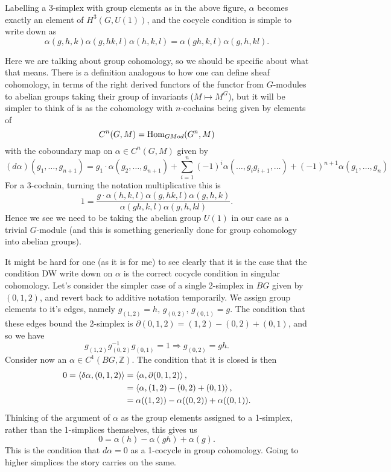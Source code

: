 \documentclass{article}
\begin{document}
Labelling a 3-simplex with group elements as in the above figure, $\alpha$ becomes exactly an element of $H^3(G, U(1))$, and the cocycle condition is simple to write down as 
\[
\alpha(g,h,k) \alpha(g,hk,l) \alpha(h,k,l) = \alpha(gh,k,l) \alpha(g,h,kl).  
\]
\begin{remark}
	Here we are talking about group cohomology, so we should be specific about what that means. There is a definition analogous to how one can define sheaf cohomology, in terms of the right derived functors of the functor from $G$-modules to abelian groups taking their group of invariants ($M \mapsto M^G$), but it will be simpler to think of is as the cohomology with $n$-cochains being given by elements of 
	\[
	C^n(G, M) = \operatorname{Hom}_{GMod}(G^n, M)
	\] 
	with the coboundary map on $\alpha \in C^n(G, M)$ given by 
	\[
	(d\alpha)(g_1, \dots, g_{n+1}) = g_1 \cdot \alpha(g_2, \dots, g_{n+1}) + \sum_{i=1}^n (-1)^i \alpha(\dots, g_i g_{i+1}, \dots ) + (-1)^{n+1} \alpha(g_1, \dots, g_n)
	\]
	For a 3-cochain, turning the notation multiplicative this is 
	\[
	1 = \frac{g\cdot \alpha(h,k,l) \alpha(g,hk,l) \alpha(g,h,k)}{\alpha(gh,k,l) \alpha(g,h,kl)} . 
	\]
	Hence we see we need to be taking the abelian group $U(1)$ in our case as a trivial $G$-module (and this is something generically done for group cohomology into abelian groups).
	
	
	It might be hard for one (as it is for me) to see clearly that it is the case that the condition DW write down on $\alpha$ is the correct cocycle condition in singular cohomology. Let's consider the simpler case of a single 2-simplex in $BG$ given by $(0,1,2)$, and revert back to additive notation temporarily. We assign group elements to it's edges, namely $g_{(1,2)} = h, \, g_{(0,2)}, \, g_{(0,1)} = g$. The condition that these edges bound the 2-simplex is $\partial (0,1,2) = (1,2) - (0,2) + (0,1)$, and so we have
	\[
	g_{(1,2)} g_{(0,2)}^{-1} g_{(0,1)} = 1 \Rightarrow g_{(0,2)} = gh.
	\]
	Consider now an $\alpha \in C^1(BG, \mathbb{Z})$. The condition that it is closed is then  
	\begin{align*}
		0 = \left\langle \delta \alpha, (0,1,2) \right\rangle &= \left\langle \alpha, \partial(0,1,2) \right\rangle , \\
		&= \left\langle \alpha, (1,2) - (0,2) + (0,1) \right\rangle , \\
		&= \alpha((1,2)) - \alpha((0,2)) + \alpha((0,1)) .  
	\end{align*}
Thinking of the argument of $\alpha$ as the group elements assigned to a 1-simplex, rather than the 1-simplices themselves, this gives us 
\[
0 = \alpha(h) - \alpha(gh) + \alpha(g). 
\]
This is the condition that $d\alpha = 0$ as a 1-cocycle in group cohomology. Going to higher simplices the story carries on the same. 
\end{remark}
\end{document}
